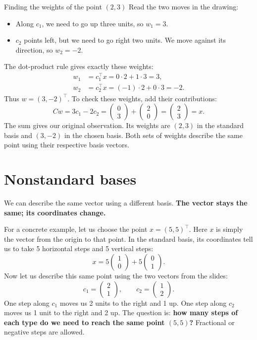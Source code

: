 \documentclass[a4paper,12pt,oneside]{report}
\begin{document}
\begin{framedexample}{Finding the weights of the point $(2,3)$}
Read the two moves in the drawing:
\begin{itemize}
  \item Along $c_1$, we need to go up three units, so $w_1=3$.
  \item $c_2$ points left, but we need to go right two units. We move
        against its direction, so $w_2=-2$.
\end{itemize}
The dot-product rule gives exactly these weights:
\[
\begin{aligned}
  w_1&=c_1^\top x=0\cdot2+1\cdot3=3,\\
  w_2&=c_2^\top x=(-1)\cdot2+0\cdot3=-2.
\end{aligned}
\]
Thus $w=(3,-2)^\top$. To check these weights, add their contributions:
\[
  Cw=3c_1-2c_2
    =\begin{pmatrix}0\\3\end{pmatrix}
     +\begin{pmatrix}2\\0\end{pmatrix}
    =\begin{pmatrix}2\\3\end{pmatrix}=x.
\]
The sum gives our original observation. Its weights are $(2,3)$ in
the standard basis and $(3,-2)$ in the chosen basis. Both sets of
weights describe the same point using their respective basis vectors.
\end{framedexample}

\clearpage
\section{Nonstandard bases}

We can describe the same vector using a different basis.
\textbf{The vector stays the same; its coordinates change.}

For a concrete example, let us choose the point $x=(5,5)^\top$.
Here $x$ is simply the vector from the origin to that point.
In the standard basis, its coordinates tell us to take 5 horizontal
steps and 5 vertical steps:
\[
  x=5\begin{pmatrix}1\\0\end{pmatrix}
    +5\begin{pmatrix}0\\1\end{pmatrix}.
\]
Now let us describe this same point using the two vectors from the slides:
\[
  c_1=\begin{pmatrix}2\\1\end{pmatrix},\qquad
  c_2=\begin{pmatrix}1\\2\end{pmatrix}.
\]
One step along $c_1$ moves us 2 units to the right and 1 up.
One step along $c_2$ moves us 1 unit to the right and 2 up.
The question is: \textbf{how many steps of each type do we need to
reach the same point $(5,5)$?} Fractional or negative steps are allowed.
\end{document}
